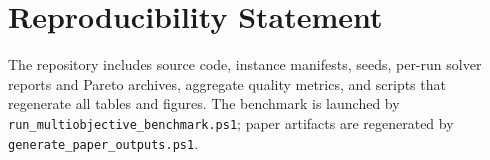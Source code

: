 \documentclass[11pt,a4paper]{article}
\begin{document}
\section*{Reproducibility Statement}

The repository includes source code, instance manifests, seeds, per-run solver reports and Pareto archives, aggregate quality metrics, and scripts that regenerate all tables and figures. The benchmark is launched by \texttt{run\_multiobjective\_benchmark.ps1}; paper artifacts are regenerated by \texttt{generate\_paper\_outputs.ps1}.



\end{document}
